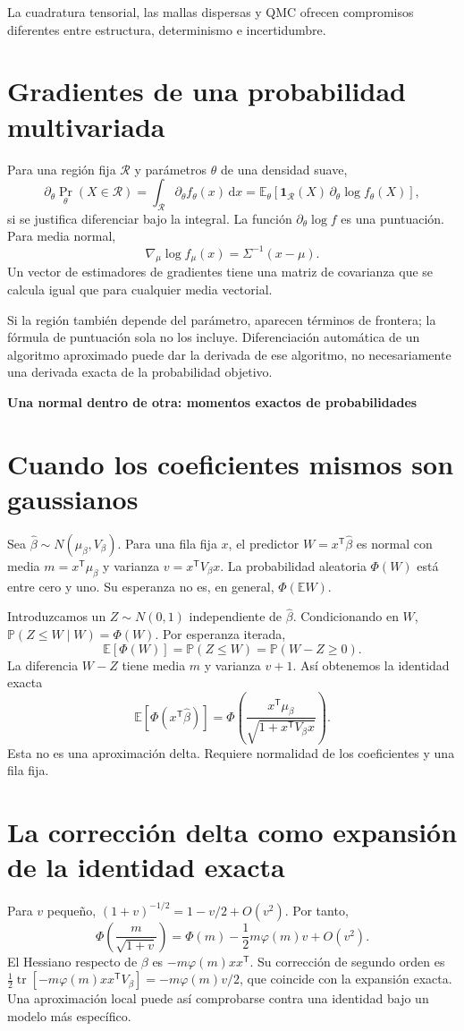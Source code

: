 \documentclass[11pt,a4paper]{article}
\newcommand{\E}{\mathbb E}
\newcommand{\Prob}{\mathbb P}
\newcommand{\ind}{\mathbf 1}
\newcommand{\dd}{\,\mathrm d}
\newcommand{\T}{^{\mathsf T}}
\DeclareMathOperator{\tr}{tr}
\theoremstyle{definition}
\newcommand{\parte}[1]{\par\bigskip\Needspace{8\baselineskip}\begin{center}{\Large\bfseries\color{azul}#1}\end{center}}
\begin{document}
La cuadratura tensorial, las mallas dispersas y QMC ofrecen compromisos diferentes entre estructura, determinismo e incertidumbre.

\section{Gradientes de una probabilidad multivariada}
Para una región fija $\mathcal R$ y parámetros $\theta$ de una densidad suave,
\[
\partial_\theta\Pr_\theta(X\in\mathcal R)
=\int_{\mathcal R}\partial_\theta f_\theta(x)\dd x
=\E_\theta[\ind_{\mathcal R}(X)\,\partial_\theta\log f_\theta(X)],
\]
si se justifica diferenciar bajo la integral. La función $\partial_\theta\log f$ es una puntuación. Para media normal,
\[
\nabla_\mu\log f_\mu(x)=\Sigma^{-1}(x-\mu).
\]
Un vector de estimadores de gradientes tiene una matriz de covarianza que se calcula igual que para cualquier media vectorial.

Si la región también depende del parámetro, aparecen términos de frontera; la fórmula de puntuación sola no los incluye. Diferenciación automática de un algoritmo aproximado puede dar la derivada de ese algoritmo, no necesariamente una derivada exacta de la probabilidad objetivo.



\parte{Una normal dentro de otra: momentos exactos de probabilidades}
\section{Cuando los coeficientes mismos son gaussianos}
Sea $\widehat\beta\sim N(\mu_\beta,V_\beta)$.
Para una fila fija $x$, el predictor
$W=x\T\widehat\beta$ es normal con media $m=x\T\mu_\beta$ y varianza $v=x\T V_\beta x$.
La probabilidad aleatoria $\Phi(W)$ está entre cero y uno.
Su esperanza no es, en general, $\Phi(\E W)$.

Introduzcamos un $Z\sim N(0,1)$ independiente de $\widehat\beta$.
Condicionando en $W$, $\Prob(Z\le W\mid W)=\Phi(W)$.
Por esperanza iterada,
\[
\E[\Phi(W)]=\Prob(Z\le W)=\Prob(W-Z\ge0).
\]
La diferencia $W-Z$ tiene media $m$ y varianza $v+1$.
Así obtenemos la identidad exacta
\[
\E[\Phi(x\T\widehat\beta)]
=\Phi\left(\frac{x\T\mu_\beta}{\sqrt{1+x\T V_\beta x}}\right).
\]
Esta no es una aproximación delta. Requiere normalidad de los coeficientes y una fila fija.

\section{La corrección delta como expansión de la identidad exacta}
Para $v$ pequeño,
$(1+v)^{-1/2}=1-v/2+O(v^2)$.
Por tanto,
\[
\Phi\left(\frac m{\sqrt{1+v}}\right)
=\Phi(m)-\frac12m\varphi(m)v+O(v^2).
\]
El Hessiano respecto de $\beta$ es
$-m\varphi(m)xx\T$.
Su corrección de segundo orden es
$\tfrac12\tr[-m\varphi(m)xx\T V_\beta]
=-m\varphi(m)v/2$,
que coincide con la expansión exacta.
Una aproximación local puede así comprobarse contra una identidad bajo un modelo más específico.
\end{document}

